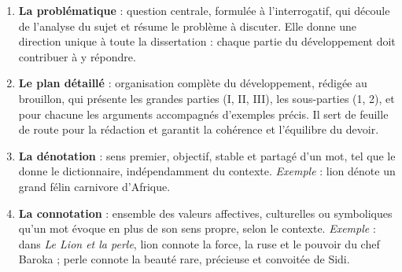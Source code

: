 \documentclass[11pt]{article}
\begin{document}
\begin{corrige}
\begin{enumerate}
\item \textbf{La problématique} : question centrale, formulée à l'interrogatif, qui découle de l'analyse du sujet et résume le problème à discuter. Elle donne une direction unique à toute la dissertation : chaque partie du développement doit contribuer à y répondre.
\item \textbf{Le plan détaillé} : organisation complète du développement, rédigée au brouillon, qui présente les grandes parties (I, II, III), les sous-parties (1, 2), et pour chacune les arguments accompagnés d'exemples précis. Il sert de feuille de route pour la rédaction et garantit la cohérence et l'équilibre du devoir.
\item \textbf{La dénotation} : sens premier, objectif, stable et partagé d'un mot, tel que le donne le dictionnaire, indépendamment du contexte. \emph{Exemple} : \og lion \fg dénote un grand félin carnivore d'Afrique.
\item \textbf{La connotation} : ensemble des valeurs affectives, culturelles ou symboliques qu'un mot évoque en plus de son sens propre, selon le contexte. \emph{Exemple} : dans \emph{Le Lion et la perle}, \og lion \fg connote la force, la ruse et le pouvoir du chef Baroka ; \og perle \fg connote la beauté rare, précieuse et convoitée de Sidi.
\end{enumerate}
\end{corrige}
\end{document}
